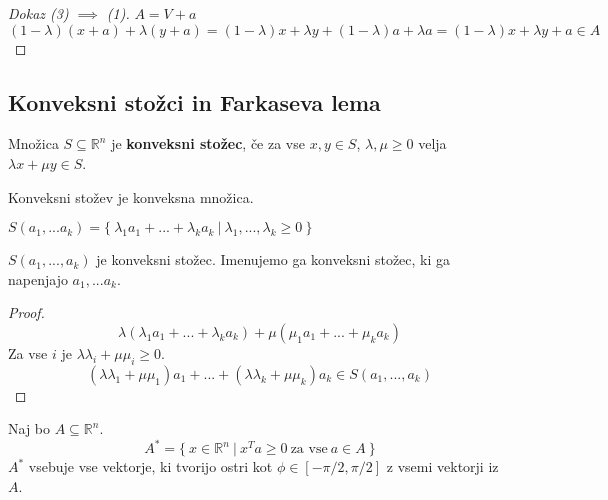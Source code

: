 \documentclass[11pt, a4paper]{article}
\begin{document}
    \begin{proof}[Dokaz \emph{(3)} \(\implies\) \emph{(1)}]
        \(A = V  + a\) \\
        \[
            (1-\lambda) (x+a) + \lambda (y+a) = (1-\lambda) x + \lambda y + (1-\lambda) a + \lambda a = (1-\lambda) x + \lambda y + a \in A
        \]
    \end{proof}



    \subsection{Konveksni stožci in Farkaseva lema}

    \begin{definition}
        Množica \(S \subseteq \mathbb{R}^n\) je \textbf{konveksni stožec}, če za vse \(x,y \in S\), \(\lambda, \mu \ge 0\) velja \(\lambda x + \mu y \in S\).
    \end{definition}

    \begin{remark}
        Konveksni stožev je konveksna množica.
    \end{remark}

    \begin{definition}
        \(S(a_1,...a_k) = \{\ \lambda_1 a_1 + ... + \lambda_k a_k\ |\ \lambda_1,...,\lambda_k \ge 0\ \}\)
    \end{definition}

    \begin{proposition}
        \(S(a_1,...,a_k)\) je konveksni stožec. Imenujemo ga konveksni stožec, ki ga napenjajo \(a_1,...a_k\).
    \end{proposition}

    \begin{proof}
        \[
            \lambda (\lambda_1 a_1 + ... + \lambda_k a_k) + \mu (\mu_1 a_1 + ... + \mu_k a_k)
        \]
        Za vse \(i\) je \(\lambda \lambda_i + \mu \mu_i \ge 0\).
        \[
            (\lambda \lambda_1 + \mu \mu_1) a_1 + ... + (\lambda \lambda_k + \mu \mu_k) a_k \in S(a_1,...,a_k)
        \]
    \end{proof}

    \begin{definition}
        Naj bo \(A \subseteq \mathbb{R}^n\).
        \[
            A^* = \{\ x \in \mathbb{R}^n\ |\ x^T a \ge 0\ \text{za vse}\ a \in A\ \}
        \]
        \(A^*\) vsebuje vse vektorje, ki tvorijo ostri kot \(\phi \in [-\pi / 2, \pi / 2]\) z vsemi vektorji iz \(A\).
    \end{definition}
\end{document}
